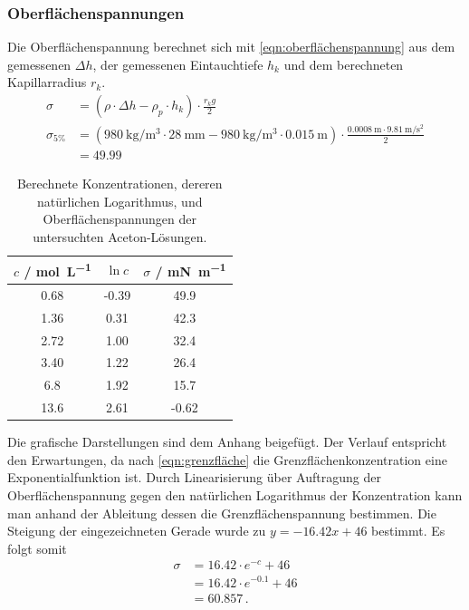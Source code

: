 \subsubsection{Oberflächenspannungen}
Die Oberflächenspannung berechnet sich mit \autoref{eqn:oberflächenspannung} aus dem gemessenen $\Delta h$, der gemessenen Eintauchtiefe $h_k$ und dem berechneten Kapillarradius $r_k$.
\begin{align*}
    \sigma &= ( \rho \cdot \Delta h - \rho_p \cdot h_k) \cdot \frac{r_k g}{2} \\
    \sigma_{5\%} &= ( \qty{980}{\kilo\gram\per\cubic\meter} \cdot \qty{28}{\milli\meter} - \qty{980}{\kilo\gram\per\cubic\meter} \cdot \qty{0.015}{\meter} )
                    \cdot \frac{\qty{0.0008}{\meter} \cdot \qty{9.81}{\meter\per\second\squared}}{2} \\
                 &= 49.99
\end{align*}
\begin{table}[H]
    \centering
    \caption{Berechnete Konzentrationen, dereren natürlichen Logarithmus, und Oberflächenspannungen der untersuchten Aceton-Lösungen.}
    \begin{tabular}{c c c}
        \toprule
        $c$ / \unit{\mole\per\liter} & $\ln c$ & $\sigma$ / \unit{\milli\newton\per\meter}  \\ \midrule
        0.68 & -0.39 & 49.9 \\ \midrule
        1.36 & 0.31 & 42.3 \\ \midrule
        2.72 & 1.00 & 32.4 \\ \midrule
        3.40 & 1.22 & 26.4 \\ \midrule
        6.8 & 1.92 & 15.7 \\ \midrule
        13.6 & 2.61 & -0.62 \\
        \bottomrule
    \end{tabular}
    \label{tab:placeholder}
\end{table}

Die grafische Darstellungen sind dem Anhang beigefügt.
Der Verlauf entspricht den Erwartungen, da nach \autoref{eqn:grenzfläche} die Grenzflächenkonzentration eine Exponentialfunktion ist.
Durch Linearisierung über Auftragung der Oberflächenspannung gegen den natürlichen Logarithmus der Konzentration kann man anhand der Ableitung dessen die Grenzflächenspannung bestimmen.
Die Steigung der eingezeichneten Gerade wurde zu $y = -16.42 x + 46$ bestimmt.
Es folgt somit
\begin{align*}
    \sigma &= 16.42 \cdot e^{-c} + 46 \\
           &= 16.42 \cdot e^{-0.1} + 46 \\
           &= 60.857\, \text{.}
\end{align*}

